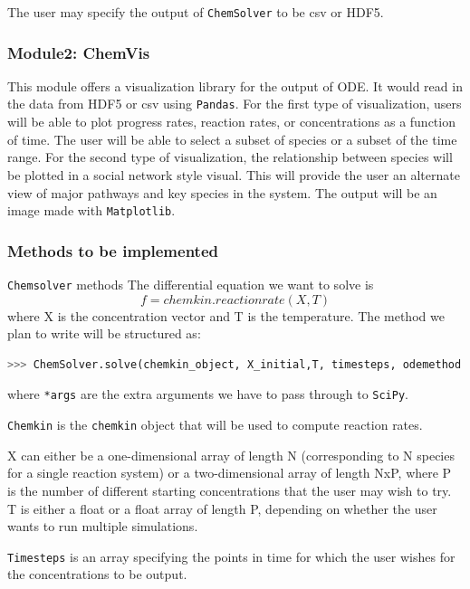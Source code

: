 \documentclass[12pt]{article}
\begin{document}
The user may specify the output of \texttt{ChemSolver} to be csv or HDF5.
\subsubsection*{Module2: ChemVis}

This module offers a visualization library for the output of ODE. It would read in the data from HDF5 or csv using \texttt{Pandas}. For the first type of visualization, users will be able to plot progress rates, reaction rates, or concentrations as a function of time. The user will be able to select a subset of species or a subset of the time range. For the second type of visualization, the relationship between species will be plotted in a social network style visual. This will provide the user an alternate view of major pathways and key species in the system. The output will be an image made with \texttt{Matplotlib}.  



\subsubsection{Methods to be implemented}
\texttt{Chemsolver} methods
The differential equation we want to solve is
$$f = chemkin.reactionrate(X,T)$$
where X is the concentration vector and T is the temperature. 
The method we plan to write will be structured as:

\begin{lstlisting}[language = Python, basicstyle = \ttfamily, breaklines = True, columns = fullflexible]
>>> ChemSolver.solve(chemkin_object, X_initial,T, timesteps, odemethod = odemethod,  outputmethod = outputmethod, *args)
\end{lstlisting}

where \texttt{*args} are the extra arguments we have to pass through to \texttt{SciPy}.

\texttt{Chemkin} is the \texttt{chemkin} object that will be used to compute reaction rates. 

X can either be a one-dimensional array of length N (corresponding to N species for a single reaction system) or a two-dimensional array of length NxP, where P is the number of different starting concentrations that the user may wish to try. T is either a float or a float array of length P, depending on whether the user wants to run multiple simulations. 

\texttt{Timesteps} is an array specifying the points in time for which the user wishes for the concentrations to be output. 
\end{document}
